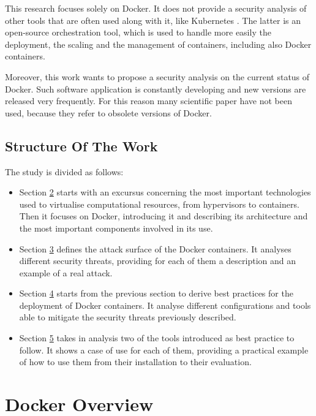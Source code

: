 \documentclass[a4paper,12pt]{article}
\begin{document}
This research focuses solely on Docker. It does not provide a security analysis
of other tools that are often used along with it, like Kubernetes
\cite{kubernetes}. The latter is an open-source orchestration tool, which is
used to handle more easily the deployment, the scaling and the management of
containers, including also Docker containers. \par Moreover, this work wants to
propose a security analysis on the current status of Docker. Such software
application is constantly developing and new versions are released very
frequently. For this reason many scientific paper have not been used, because
they refer to obsolete versions of Docker.

\subsection{Structure Of The Work}

The study is divided as follows:
\begin{itemize}
  \item Section \hyperref[sec:docker_overview]{2} starts with an excursus
  concerning the most important technologies used to virtualise computational
  resources, from hypervisors to containers. Then it focuses on Docker,
  introducing it and describing its architecture and the most important
  components involved in its use. 
  \item Section \hyperref[sec:docker_security_threats]{3} defines the
  attack surface of the Docker containers. It analyses different security
  threats, providing for each of them a description and an example of a real
  attack. 
  \item Section \hyperref[sec:best_practices_for_docker_deployment]{4} starts
  from the previous section to derive best practices for the deployment of
  Docker containers. It analyse different configurations and tools able to
  mitigate the security threats previously described.
  \item Section \hyperref[sec:practical_evaluation]{5} takes in analysis two of
  the tools introduced as best practice to follow. It shows a case of use for
  each of them, providing a practical example of how to use them from their
  installation to their evaluation.
\end{itemize}

\newpage

\section{Docker Overview}
\label{sec:docker_overview}
\end{document}
